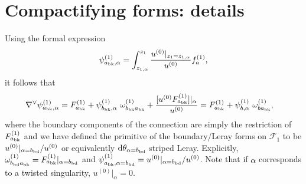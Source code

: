 \documentclass[11pt]{article}
\renewcommand{\d}{\text{d}}
\newcommand{\be}{\begin{equation}}
\newcommand{\ee}{\end{equation}}
\newcommand{\F}{\mathcal{F}}
\newcommand{\bk}{{\rm bk}}
\newcommand{\bd}{{\rm bd}}
\begin{document}
\section{Compactifying forms: details \label{app:compactifying-dets} }

Using the formal expression
\be
	\psi^{(1)}_{{a_\bk},\alpha} = \int_{z_{1,\alpha}}^{z_1} \frac{u^{(0)}\vert_{z_1=z_{1,\alpha}}}{u^{(0)}} f_a^{(1)},
\ee
it follows that 
\begin{align}
	\nabla^\vee \psi^{(1)}_{{a_\bk},\alpha}
	&= F^{(1)}_{a_\bk} + \psi^{(1)}_{b_\bk,\alpha}\ \omega^{(1)}_{b_\bk a_\bk} 
		+ \frac{[u^{(0)} F^{(1)}_{a_\bk}]\vert_\alpha}{u^{(0)}}
	= F^{(1)}_{a_\bk} + \psi^{(1)}_{b,\alpha}\ \omega^{(1)}_{b{a_\bk}},
\end{align}
where the boundary components of the connection are simply the restriction of $F^{(1)}_{a_\bk}$ and we have defined the primitive of the boundary/Leray forms on $\F_1$ to be $u^{(0)}\vert_{\alpha = b_\bd}/u^{(0)}$ or equivalently $\d\theta_{\alpha = b_\bd}$ striped Leray. 
Explicitly, $\omega^{(1)}_{b_\bd a_\bk} = F^{(1)}_{a_\bk}\vert_{\alpha = b_\bd}$ and $\psi^{(1)}_{{a_\bk},\alpha=b_\bd} = u^{(0)}\vert_{\alpha = b_\bd}/u^{(0)}$. 
Note that if $\alpha$ corresponds to a twisted singularity, $u^{(0)}\vert_{\alpha} = 0$.
\end{document}
